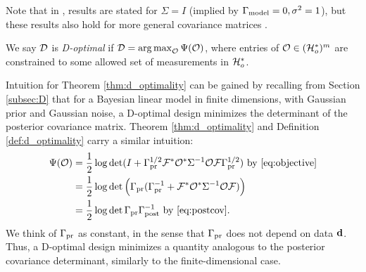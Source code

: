 Note that in \cite{AlexanderianGloorGhattas14,
  alexanderian2018efficient}, results are stated for \(\Sigma=I\)
(implied by \(\Gamma_{\textup{model}} = 0,\sigma^2=1\)), but these results also hold
for more general covariance matrices
\cite[p. 681]{AlexanderianGloorGhattas14}.

\begin{definition}\label{def:d_optimality}
  We say \(\mathcal{D}\) is \emph{D-optimal} if \(\mathcal{D} =
  \operatorname*{arg\,max}_{\mathcal{O}} \Psi(\mathcal{O})\), where entries of \(\mathcal{O} \in (\mathcal{H}_o^*)^m\)
  are constrained to some allowed set of measurements in \(\mathcal{H}_o^*\).
\end{definition}

Intuition for Theorem \ref{thm:d_optimality} can be gained by
recalling from Section \ref{subsec:D} that for a Bayesian linear model
in finite dimensions, with Gaussian prior and Gaussian noise, a
D-optimal design minimizes the determinant of the posterior covariance
matrix. Theorem
\ref{thm:d_optimality} and Definition \ref{def:d_optimality} carry a
similar intuition:
\begin{align*}
  \begin{split}
    \tar(\obs) &= \frac12 \log \det ( I + \prcov^{1/2}  \fwd ^* \obs^* \Sigma^{-1} \obs \fwd \prcov^{1/2}) \text{ by \eqref{eq:objective}}\\
    &= \frac12 \log \det \Big( \prcov ( \prcov^{-1} + \fwd ^* \obs^* \Sigma^{-1} \obs \fwd) \Big )\\
    &= \frac12 \log \det \prcov \postcov^{-1} \text{ by \eqref{eq:postcov}}.
  \end{split}
\end{align*}
We think of \(\Gamma_{\textup{pr}}\) as constant, in the sense that $\Gamma_{\textup{pr}}$ does
not depend on data $\mathbf{d}$. Thus, a D-optimal design minimizes a
quantity analogous to the posterior covariance determinant, similarly
to the finite-dimensional case.


